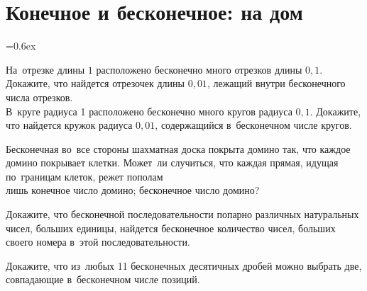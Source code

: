 
\section*{Конечное и бесконечное: на дом}




\vspace{-1.0ex}

\begin{problems}\parskip=0.6ex

\sp
На~отрезке длины $1$ расположено бесконечно много отрезков длины $0{,}1$.
Докажите, что найдется отрезочек длины $0{,}01$, лежащий внутри бесконечного
числа отрезков. 
\\
\sp
В~круге радиуса 1 расположено бесконечно много кругов радиуса $0{,}1$.
Докажите, что найдется кружок радиуса $0{,}01$, содержащийся в~бесконечном
числе кругов.

Бесконечная во~все стороны шахматная доска покрыта домино так, что каждое
домино покрывает клетки.
Может~ли случиться, что каждая прямая, идущая по~границам клеток, режет пополам
\\
\sp
лишь конечное число домино;
\qquad
\sp
бесконечное число домино?

Докажите, что бесконечной последовательности попарно различных натуральных
чисел, больших единицы, найдется бесконечное количество чисел, больших своего
номера в~этой последовательности.

Докажите, что из~любых 11 бесконечных десятичных дробей можно выбрать две,
совпадающие в~бесконечном числе позиций.

\end{problems}

